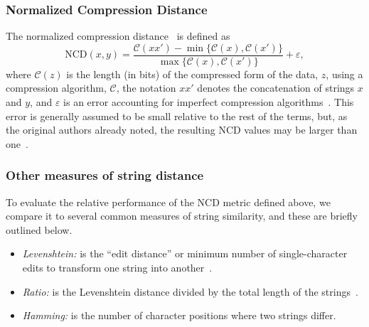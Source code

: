 \documentclass[preprint,12pt]{elsarticle}
\begin{document}
\subsubsection{Normalized Compression Distance}
\label{ncd}

The normalized compression distance~\citep[NCD;][]{ncd} is defined as
\begin{equation}
    \text{NCD}(x, y) = \frac{\mathcal{C}(xx') - \min\{\mathcal{C}(x), \mathcal{C}(x')\}}{\max\{\mathcal{C}(x), \mathcal{C}(x')\}} + \varepsilon,
\end{equation}
where $\mathcal{C}(z)$ is the length (in bits) of the compressed form of the data, $z$, using a compression algorithm, $\mathcal{C}$, the notation $xx'$ denotes the concatenation of strings $x$ and $y$, and $\varepsilon$ is an error accounting for imperfect compression algorithms~\cite{ncd}. This error is generally assumed to be small relative to the rest of the terms, but, as the original authors already noted, the resulting NCD values may be larger than one~\cite{ncd}.



\subsubsection{Other measures of string distance}
\label{string_metrics}

To evaluate the relative performance of the NCD metric defined above, we compare it to several common measures of string similarity, and these are briefly outlined below.
\begin{itemize}
    \item \textit{Levenshtein:} is the ``edit distance'' or minimum number of single-character edits to transform one string into another~\cite{navarro2001guided}.
    \item \textit{Ratio:} is the Levenshtein distance divided by the total length of the strings~\cite{levenshtein}.
    \item \textit{Hamming:} is the number of character positions where two strings differ.
\end{itemize}

\end{document}
